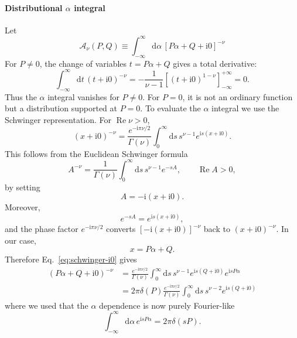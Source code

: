 \documentclass[11pt]{article}
\newcommand{\dd}{\mathrm d}
\newcommand{\ii}{\mathrm i}
\begin{document}
\paragraph{Distributional $\alpha$ integral}
Let
\begin{equation}
\mathcal A_\nu(P,Q)
\equiv
\int_{-\infty}^{\infty}\dd\alpha\,
[P\alpha+Q+\ii0]^{-\nu}
\end{equation}
For $P\ne0$, the change of variables $t=P\alpha+Q$ gives a total derivative:
\begin{equation}
\int_{-\infty}^{\infty}\dd t\,(t+\ii0)^{-\nu}
=
-\frac{1}{\nu-1}
\left[(t+\ii0)^{1-\nu}\right]_{-\infty}^{+\infty}=0.
\end{equation}
Thus the $\alpha$ integral vanishes for $P\ne0$.  For $P=0$, it is not an ordinary function but a distribution supported at $P=0$.
To evaluate the $\alpha$ integral we use the Schwinger representation. For $\operatorname{Re}\nu>0$,
\begin{equation}
(x+\ii0)^{-\nu}
=
\frac{e^{-\ii\pi\nu/2}}{\Gamma(\nu)}
\int_0^\infty \dd s\,
 s^{\nu-1}e^{\ii s(x+\ii0)}.
\label{eq:schwinger-i0}
\end{equation}
This follows from the Euclidean Schwinger formula
\begin{equation}
A^{-\nu}=
\frac{1}{\Gamma(\nu)}
\int_0^\infty \dd s\,
 s^{\nu-1}e^{-sA},
\qquad
\operatorname{Re}A>0,
\end{equation}
by setting
\begin{equation}
A=-\ii(x+\ii0).
\end{equation}
Moreover,
\begin{equation}
e^{-sA}=e^{\ii s(x+\ii0)},
\end{equation}
and the phase factor $e^{-\ii\pi\nu/2}$ converts $[-\ii(x+\ii0)]^{-\nu}$ back to $(x+\ii0)^{-\nu}$.
In our case,
\begin{equation}
x=P\alpha+Q.
\end{equation}
Therefore Eq.~\eqref{eq:schwinger-i0} gives
\begin{align}
(P\alpha+Q+\ii0)^{-\nu}
&=
\frac{e^{-\ii\pi\nu/2}}{\Gamma(\nu)}
\int_0^\infty \dd s\,
 s^{\nu-1}e^{\ii s(Q+\ii0)}e^{\ii sP\alpha}\\
 &=
2\pi\delta(P)
\frac{e^{-\ii\pi\nu/2}}{\Gamma(\nu)}
\int_0^\infty \dd s\,
 s^{\nu-2}e^{\ii s(Q+\ii0)}
\end{align}
where we used that the $\alpha$ dependence is now purely Fourier-like
\begin{equation}
\int_{-\infty}^{\infty}\dd\alpha\,e^{\ii sP\alpha}=2\pi\delta(sP).
\label{eq:alpha-fourier-delta}
\end{equation}
\end{document}
